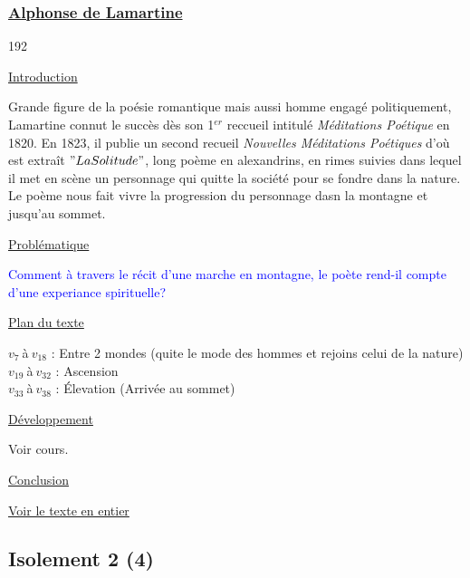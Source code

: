 \documentclass[12pt,a4paper]{article}
\begin{document}
			\subsubsection{\href{Bio/La_Martine.pdf}{Alphonse de Lamartine}}
\begin{dingautolist}{192}

\item \underline{Introduction} \par
		Grande figure de la po\'esie romantique mais aussi homme engag\'e politiquement, Lamartine connut le succ\`es d\`es son 1$^{er}$ reccueil intitul\'e \textit{M\'editations Po\'etique} en 1820. 
		En 1823, il publie un second recueil \textit{Nouvelles M\'editations Po\'etiques} d'o\`u est extra\^it $"La Solitude"$, 
		long po\`eme en alexandrins, en rimes suivies dans lequel il met en sc\`ene un personnage qui quitte la soci\'et\'e pour se fondre dans la nature. 
		Le po\`eme nous fait vivre la progression du personnage dasn la montagne et jusqu'au sommet.

\item \underline{Probl\'ematique }\par
		\textcolor{blue}{Comment \`a travers le r\'ecit d'une marche en montagne, le po\`ete rend-il compte d'une experiance spirituelle?}

\item \underline{Plan du texte} \par
		$v_{7}~$\`a$~v_{18}$ : Entre 2 mondes (quite le mode des hommes et rejoins celui de la nature)\\
		$v_{19}~$\`a$~v_{32}$ : Ascension\\
		$v_{33}~$\`a$~v_{38}$ : \'Elevation (Arriv\'ee au sommet)

\item \underline{D\'eveloppement} \par
		Voir cours.

\item \underline{Conclusion} \par


\end{dingautolist}
\href{Textes/Solitude.pdf}{Voir le texte en entier}
 \newpage

			\subsection{Isolement 2 (4)}
\end{document}
